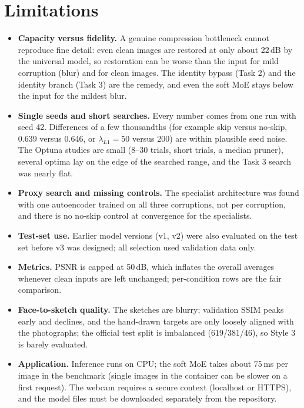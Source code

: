 \documentclass[conference]{IEEEtran}
\begin{document}
\section{Limitations}
\begin{itemize}
\item \textbf{Capacity versus fidelity.} A genuine compression bottleneck cannot reproduce fine detail: even clean images are restored at only about 22\,dB by the universal model, so restoration can be worse than the input for mild corruption (blur) and for clean images. The identity bypass (Task 2) and the identity branch (Task 3) are the remedy, and even the soft MoE stays below the input for the mildest blur.
\item \textbf{Single seeds and short searches.} Every number comes from one run with seed 42. Differences of a few thousandths (for example skip versus no-skip, 0.639 versus 0.646, or $\lambda_{L1}=50$ versus 200) are within plausible seed noise. The Optuna studies are small (8--30 trials, short trials, a median pruner), several optima lay on the edge of the searched range, and the Task 3 search was nearly flat.
\item \textbf{Proxy search and missing controls.} The specialist architecture was found with one autoencoder trained on all three corruptions, not per corruption, and there is no no-skip control at convergence for the specialists.
\item \textbf{Test-set use.} Earlier model versions (v1, v2) were also evaluated on the test set before v3 was designed; all selection used validation data only.
\item \textbf{Metrics.} PSNR is capped at 50\,dB, which inflates the overall averages whenever clean inputs are left unchanged; per-condition rows are the fair comparison.
\item \textbf{Face-to-sketch quality.} The sketches are blurry; validation SSIM peaks early and declines, and the hand-drawn targets are only loosely aligned with the photographs; the official test split is imbalanced (619/381/46), so Style 3 is barely evaluated.
\item \textbf{Application.} Inference runs on CPU; the soft MoE takes about 75\,ms per image in the benchmark (single images in the container can be slower on a first request). The webcam requires a secure context (localhost or HTTPS), and the model files must be downloaded separately from the repository.
\end{itemize}
\end{document}
